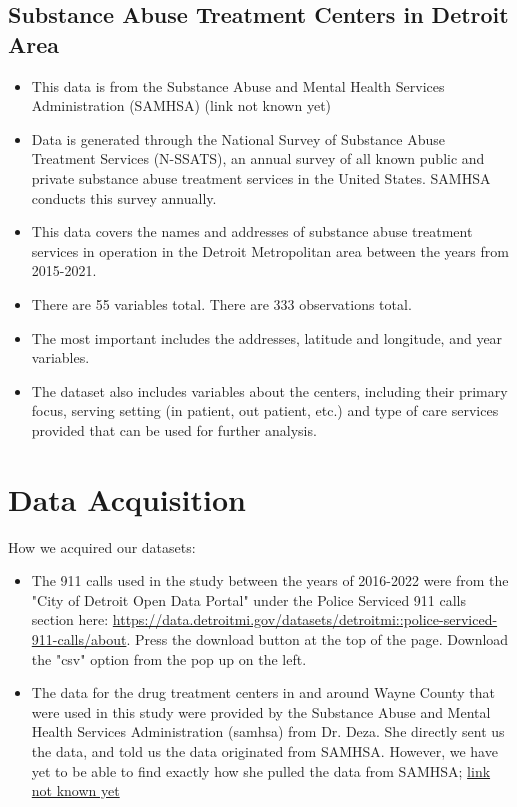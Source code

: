 \documentclass[12pt]{article}
\begin{document}
\subsection{Substance Abuse Treatment Centers in Detroit Area}
    \begin{itemize}
        \item This data is from the Substance Abuse and Mental Health Services Administration (SAMHSA) (link not known yet)
  \item Data is generated through the National Survey of Substance Abuse Treatment Services (N-SSATS), an annual survey of all known public and private substance abuse treatment services in the United States. SAMHSA conducts this survey annually.
  \item This data covers the names and addresses of substance abuse treatment services in operation in the Detroit Metropolitan area between the years from 2015-2021. 
  \item There are 55 variables total. There are 333 observations total. 
  \item The most important includes the addresses, latitude and longitude, and year variables. 
  \item   The dataset also includes variables about the centers, including their primary focus, serving setting (in patient, out patient, etc.) and type of care services provided that can be used for further analysis.
  \end{itemize}


\section{Data Acquisition}
\label{sec:theory}
How we acquired our datasets:
\begin{itemize}
    \item The 911 calls used in the study between the years of 2016-2022 were from the "City of Detroit Open Data Portal" under the Police Serviced 911 calls section here:
    \url{https://data.detroitmi.gov/datasets/detroitmi::police-serviced-911-calls/about}. Press the download button at the top of the page. Download the "csv" option from the pop up on the left.
    \item The data for the drug treatment centers in and around Wayne County that were used in this study were provided by the Substance Abuse and Mental Health Services Administration  (samhsa) from Dr. Deza. She directly sent us the data, and told us the data originated from SAMHSA. However, we have yet to be able to find exactly how she pulled the data from SAMHSA;
    \url{link not known yet}
\end{itemize}
\end{document}
